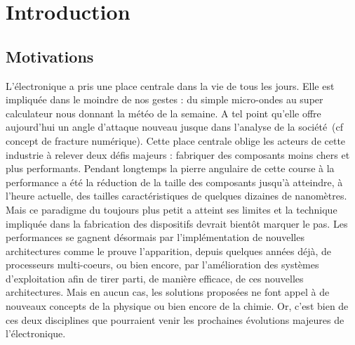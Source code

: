\chapter*{Introduction}
\setcounter{figure}{0}

\section*{Motivations}
L'électronique a pris une place centrale dans la vie de tous les jours. Elle est impliquée dans le moindre de nos gestes : du simple micro-ondes au super calculateur nous donnant la météo de la semaine. A tel point qu'elle offre aujourd'hui un angle d'attaque nouveau jusque dans l'analyse de la société~(cf concept de fracture numérique). Cette place centrale oblige les acteurs de cette industrie à relever deux défis majeurs : fabriquer des composants moins chers et plus performants. Pendant longtemps la pierre angulaire de cette course à la performance a été la réduction de la taille des composants jusqu'à atteindre, à l'heure actuelle, des tailles caractéristiques de quelques dizaines de nanomètres. Mais ce paradigme du toujours plus petit a atteint ses limites et la technique impliquée dans la fabrication des dispositifs devrait bientôt marquer le pas. Les performances se gagnent désormais par l'implémentation de nouvelles architectures comme le prouve l'apparition, depuis quelques années déjà, de processeurs multi-coeurs, ou bien encore, par l'amélioration des systèmes d'exploitation afin de tirer parti, de manière efficace, de ces nouvelles architectures. Mais en aucun cas, les solutions proposées ne font appel à de nouveaux concepts de la physique ou bien encore de la chimie. Or, c'est bien de ces deux disciplines que pourraient venir les prochaines évolutions majeures de l'électronique.

